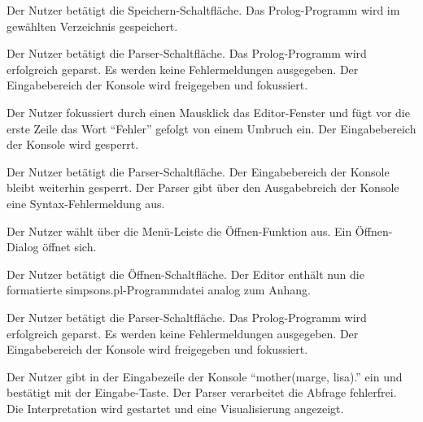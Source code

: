 \documentclass[parskip=full,11pt,twoside]{scrartcl}
\begin{document}
{Der Nutzer betätigt die Speichern-Schaltfläche.}
{Das Prolog-Programm wird im gewählten Verzeichnis gespeichert.}

{Der Nutzer betätigt die Parser-Schaltfläche.}
{Das Prolog-Programm wird erfolgreich geparst. Es werden keine Fehlermeldungen ausgegeben. Der Eingabebereich der Konsole wird freigegeben und fokussiert.}

{Der Nutzer fokussiert durch einen Mausklick das Editor-Fenster und fügt vor die erste Zeile das Wort \enquote{Fehler} gefolgt von einem Umbruch ein.}
{Der Eingabebereich der Konsole wird gesperrt.}

{Der Nutzer betätigt die Parser-Schaltfläche.}
{Der Eingabebereich der Konsole bleibt weiterhin gesperrt. Der Parser gibt über den Ausgabebreich der Konsole eine Syntax-Fehlermeldung aus.}



{Der Nutzer wählt über die Menü-Leiste die Öffnen-Funktion aus.}
{Ein Öffnen-Dialog öffnet sich.}

{Der Nutzer betätigt die Öffnen-Schaltfläche.}
{Der Editor enthält nun die formatierte simpsons.pl-Programmdatei analog zum Anhang.}

{Der Nutzer betätigt die Parser-Schaltfläche.}
{Das Prolog-Programm wird erfolgreich geparst. Es werden keine Fehlermeldungen ausgegeben. Der Eingabebereich der Konsole wird freigegeben und fokussiert.}

{Der Nutzer gibt in der Eingabezeile der Konsole \enquote{mother(marge, lisa).} ein und bestätigt mit der Eingabe-Taste.}
{Der Parser verarbeitet die Abfrage fehlerfrei. Die Interpretation wird gestartet und eine Visualisierung angezeigt.}
\end{document}
